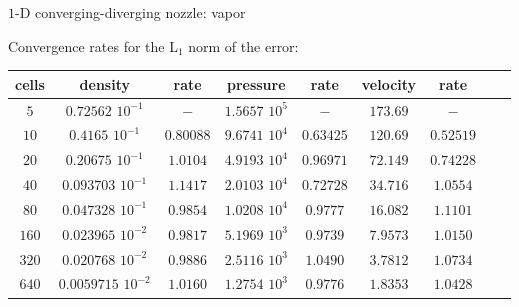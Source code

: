 \documentclass[xcolor=dvipsnames,10pt]{beamer}
\begin{document}
\begin{frame}{$1$-D converging-diverging nozzle: vapor}
\begin{center}
Convergence rates for the L$_1$ norm of the error:
\end{center}
\begin{table}[H]
\begin{center}
 \begin{tabular}{|c|c|c|c|c|c|c|c|c|}
 \hline
cells & density              & rate      & pressure          & rate      & velocity & rate      \\ \hline
$5$  & $0.72562$   $10^{-1}$ & $-$       & $1.5657$ $10^{5}$ & $-$       & $173.69$ & $-$       \\ \hline
$10$ & $0.4165$    $10^{-1}$ & $0.80088$ & $9.6741$ $10^{4}$ & $0.63425$ & $120.69$ & $0.52519$ \\ \hline
$20$ & $0.20675$   $10^{-1}$ & $1.0104$  & $4.9193$ $10^{4}$ & $0.96971$ & $72.149$ & $0.74228$ \\ \hline
$40$ & $0.093703$  $10^{-1}$ & $1.1417$  & $2.0103$ $10^{4}$ & $0.72728$ & $34.716$ & $1.0554$  \\ \hline
$80$ & $0.047328$  $10^{-1}$ & $0.9854$  & $1.0208$ $10^{4}$ & $0.9777$  & $16.082$ & $1.1101$  \\ \hline
$160$& $0.023965$  $10^{-2}$ & $0.9817$  & $5.1969$ $10^{3}$ & $0.9739$  & $7.9573$ & $1.0150$  \\ \hline
$320$& $0.020768$  $10^{-2}$ & $0.9886$  & $2.5116$ $10^{3}$ & $1.0490$  & $3.7812$ & $1.0734$  \\ \hline
$640$& $0.0059715$ $10^{-2}$ & $1.0160$  & $1.2754$ $10^{3}$ & $0.9776$  & $1.8353$ & $1.0428$  \\ \hline
\end{tabular}
\end{center}
\nonumber
\end{table}
\end{frame}
\end{document}
